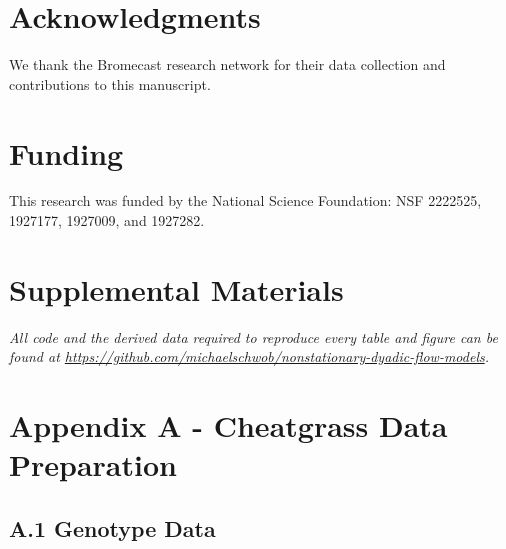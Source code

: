 \documentclass{article}
\begin{document}
\section*{Acknowledgments}
We thank the Bromecast research network for their data collection and contributions to this manuscript.

\section*{Funding}
This research was funded by the National Science Foundation: NSF 2222525, 1927177, 1927009, and 1927282.

\section*{Supplemental Materials}
\textit{All code and the derived data required to reproduce every table and figure can be found at \url{https://github.com/michaelschwob/nonstationary-dyadic-flow-models}.}




\newpage 

\setcounter{figure}{0}
\setcounter{table}{0}
\renewcommand{\thefigure}{S\arabic{figure}}
\renewcommand{\thetable}{S\arabic{table}}
\renewcommand{\figurename}{Supplemental Figure}
\renewcommand{\tablename}{Supplemental Table}

\section*{Appendix A - Cheatgrass Data Preparation}

\subsection*{A.1 Genotype Data}
\end{document}
